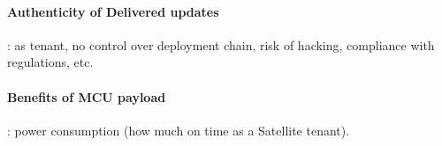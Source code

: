 \paragraph*{Authenticity of Delivered updates}: as tenant, no control over deployment
chain, risk of hacking, compliance with regulations, etc.
\paragraph*{Benefits of MCU payload}: power consumption (how much
on time as a Satellite tenant).


\iffalse

\subsection{Open Source} \cite{shalashov2021OpenSourceCubeSatReview}, \cite{Holliday2019PyCubed}
\paragraph*{Why Open-Source Satellite Initiatives}
\paragraph*{pyCube, etc.}
\paragraph*{RIOT}: project overview, architecture overview\cite{baccelli2018riot}


\subsection{LoRa}
\label{sec:lora-cubesat}
\paragraph*{CubeSat LoRa missions} \cite{saeed2020CubeSatReview}
\paragraph*{Research topics, challenges of LoRa in space} \cite{saeed2020CubeSatReview}

\fi
